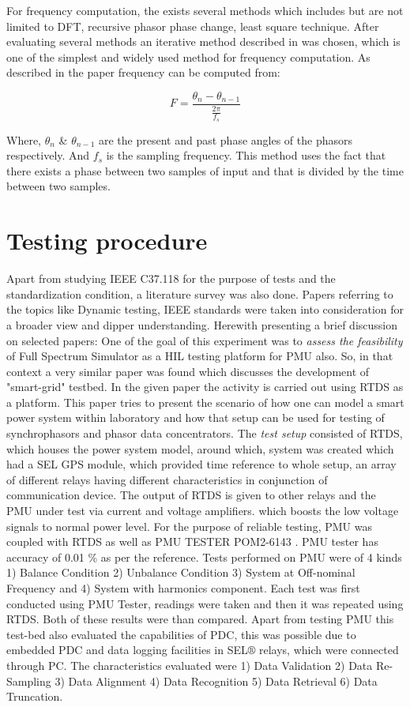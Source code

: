  For frequency computation, the exists several methods which includes but are not limited to DFT, recursive phasor phase change, least square technique. After evaluating several methods an iterative method described in \cite{sidhu1998iterative} was chosen, which is one of the simplest and widely used method for frequency computation. As described in the paper frequency can be computed from:
 
 \begin{equation}
 F = \frac{\theta_{n} - \theta_{n-1}}{\frac{2\pi}{f_s}} 
 \end{equation}
 
 Where, $\theta_{n}$ \& $\theta_{n-1}$ are the present and past phase angles of the phasors respectively. And $f_s$ is the sampling frequency. This method uses the fact that there exists a phase between two samples of input and that is divided by the time between two samples.  
  
\section{Testing procedure}
Apart from studying IEEE C37.118 for the purpose of tests and the standardization condition, a literature survey was also done. Papers referring to the topics like Dynamic testing, IEEE standards were taken into consideration for a broader view and dipper understanding. Herewith presenting a brief discussion on selected papers:
One of the goal of this experiment was to \textit{assess the feasibility} of Full Spectrum Simulator as a HIL testing platform for PMU also. So, in that context a very similar paper was found \cite{Paper:saugata} which discusses the development of "smart-grid" testbed. In the given paper the activity is carried out using RTDS as a platform. This paper tries to present the scenario of how one can model a smart power system within laboratory and how that setup can be used for testing of synchrophasors and phasor data concentrators. The \textit{test setup} consisted of RTDS, which houses the power system model, around which, system was created which had a SEL GPS module, which provided time reference to whole setup, an array of different relays having different characteristics in conjunction of communication device. The output of RTDS is given to other relays and the PMU under test via current and voltage amplifiers. which boosts the low voltage signals to normal power level. For the purpose of reliable testing, PMU was coupled with RTDS as well as PMU TESTER POM2-6143 \cite{Paper:saugata}. PMU tester has accuracy of 0.01 \% as per the reference. Tests performed on PMU were of 4 kinds 1) Balance Condition 2) Unbalance Condition 3) System at Off-nominal Frequency and 4) System with harmonics component. Each test was first conducted using PMU Tester, readings were taken and then it was repeated using RTDS. Both of these results were than compared. Apart from testing PMU this test-bed also evaluated the capabilities of PDC, this was possible due to embedded PDC and data logging facilities in SEL$\circledR$ relays, which were connected through PC. The characteristics evaluated were 1) Data Validation 2) Data Re-Sampling 3) Data Alignment 4) Data Recognition 5) Data Retrieval 6) Data Truncation.

